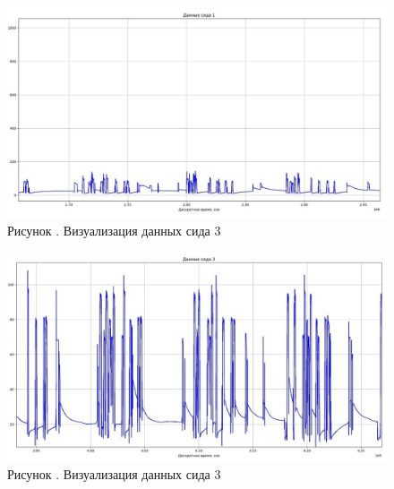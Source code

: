      \begin{figure}
  	\centering
  	\def\svgwidth{\textwidth}
  	\includegraphics[scale=0.8]{images/data_1_visual_3.jpg}
  	\caption*{\gostFont Рисунок \thechaptercntr .\theimagecntr \spc {--} Визуализация данных сида 3}
  	\label{fig:MLADBlackBox}
  \end{figure} \addtocounter{imagecntr}{1}
  
     \begin{figure}
  	\centering
  	\def\svgwidth{\textwidth}
  	\includegraphics[scale=0.8]{images/data_3_visual_3.jpg}
  	\caption*{\gostFont Рисунок \thechaptercntr .\theimagecntr \spc {--} Визуализация данных сида 3}
  	\label{fig:MLADBlackBox}
  \end{figure} \addtocounter{imagecntr}{1}
  
